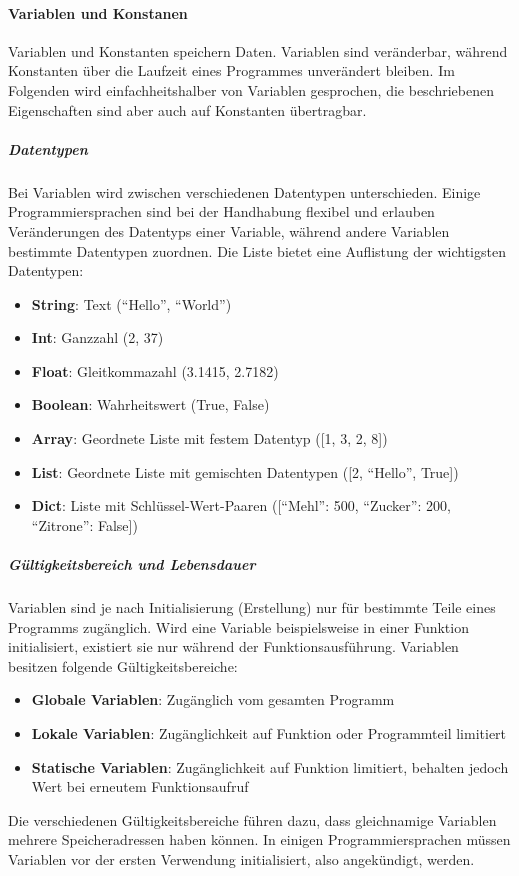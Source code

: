 \documentclass[11pt, a4paper]{article}
\begin{document}
\paragraph{Variablen und Konstanen}
Variablen und Konstanten speichern Daten. Variablen sind veränderbar, während Konstanten über die Laufzeit eines Programmes unverändert bleiben. Im Folgenden wird einfachheitshalber von Variablen gesprochen, die beschriebenen Eigenschaften sind aber auch auf Konstanten übertragbar.
\subparagraph{Datentypen}
Bei Variablen wird zwischen verschiedenen Datentypen unterschieden. Einige Programmiersprachen sind bei der Handhabung flexibel und erlauben Veränderungen des Datentyps einer Variable, während andere Variablen bestimmte Datentypen zuordnen. Die Liste bietet eine Auflistung der wichtigsten Datentypen:
\begin{itemize}
	\item \textbf{String}: Text (``Hello'', ``World'')
	\item \textbf{Int}: Ganzzahl (2, 37)
	\item \textbf{Float}: Gleitkommazahl (3.1415, 2.7182)
	\item \textbf{Boolean}: Wahrheitswert (True, False)
	\item \textbf{Array}: Geordnete Liste mit festem Datentyp ([1, 3, 2, 8])
	\item \textbf{List}: Geordnete Liste mit gemischten Datentypen ([2, ``Hello'', True])
	\item \textbf{Dict}: Liste mit Schlüssel-Wert-Paaren ([``Mehl'': 500, ``Zucker'': 200, ``Zitrone'': False])
\end{itemize}
\subparagraph{Gültigkeitsbereich und Lebensdauer}
Variablen sind je nach Initialisierung (Erstellung) nur für bestimmte Teile eines Programms zugänglich. Wird eine Variable beispielsweise in einer Funktion initialisiert, existiert sie nur während der Funktionsausführung. Variablen besitzen folgende Gültigkeitsbereiche:
\begin{itemize}
	\item \textbf{Globale Variablen}: Zugänglich vom gesamten Programm
	\item \textbf{Lokale Variablen}: Zugänglichkeit auf Funktion oder Programmteil limitiert
	\item \textbf{Statische Variablen}: Zugänglichkeit auf Funktion limitiert, behalten jedoch Wert bei erneutem Funktionsaufruf
\end{itemize}
Die verschiedenen Gültigkeitsbereiche führen dazu, dass gleichnamige Variablen mehrere Speicheradressen haben können. In einigen Programmiersprachen müssen Variablen vor der ersten Verwendung initialisiert, also angekündigt, werden.
\end{document}
